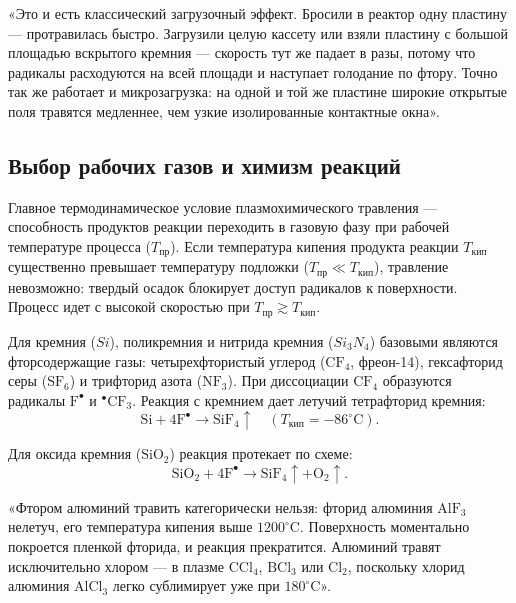 \documentclass[12pt,a4paper]{article}
\theoremstyle{plain}
\theoremstyle{definition}
\theoremstyle{remark}
\numberwithin{equation}{section}
\begin{document}
«Это и есть классический загрузочный эффект. Бросили в реактор одну пластину — протравилась быстро. Загрузили целую кассету или взяли пластину с большой площадью вскрытого кремния — скорость тут же падает в разы, потому что радикалы расходуются на всей площади и наступает голодание по фтору. Точно так же работает и микрозагрузка: на одной и той же пластине широкие открытые поля травятся медленнее, чем узкие изолированные контактные окна».

\subsection{Выбор рабочих газов и химизм реакций}

Главное термодинамическое условие плазмохимического травления --- способность продуктов реакции переходить в газовую фазу при рабочей температуре процесса ($T_\text{пр}$). Если температура кипения продукта реакции $T_\text{кип}$ существенно превышает температуру подложки ($T_\text{пр} \ll T_\text{кип}$), травление невозможно: твердый осадок блокирует доступ радикалов к поверхности. Процесс идет с высокой скоростью при $T_\text{пр} \gtrsim T_\text{кип}$.

Для кремния ($Si$), поликремния и нитрида кремния ($Si_3N_4$) базовыми являются фторсодержащие газы: четырехфтористый углерод ($\mathrm{CF}_4$, фреон-14), гексафторид серы ($\mathrm{SF}_6$) и трифторид азота ($\mathrm{NF}_3$). При диссоциации $\mathrm{CF}_4$ образуются радикалы $\mathrm{F}^\bullet$ и $^\bullet\mathrm{CF}_3$. Реакция с кремнием дает летучий тетрафторид кремния:
\begin{equation*}
  \mathrm{Si} + 4\mathrm{F}^\bullet \to \mathrm{SiF}_4\uparrow \quad (T_\text{кип} = -86^\circ\mathrm{C}).
\end{equation*}

Для оксида кремния ($\mathrm{SiO}_2$) реакция протекает по схеме:
\begin{equation*}
  \mathrm{SiO}_2 + 4\mathrm{F}^\bullet \to \mathrm{SiF}_4\uparrow + \mathrm{O}_2\uparrow.
\end{equation*}

«Фтором алюминий травить категорически нельзя: фторид алюминия $\mathrm{AlF}_3$ нелетуч, его температура кипения выше $1200^\circ\mathrm{C}$. Поверхность моментально покроется пленкой фторида, и реакция прекратится. Алюминий травят исключительно хлором — в плазме $\mathrm{CCl}_4$, $\mathrm{BCl}_3$ или $\mathrm{Cl}_2$, поскольку хлорид алюминия $\mathrm{AlCl}_3$ легко сублимирует уже при $180^\circ\mathrm{C}$».
\end{document}
